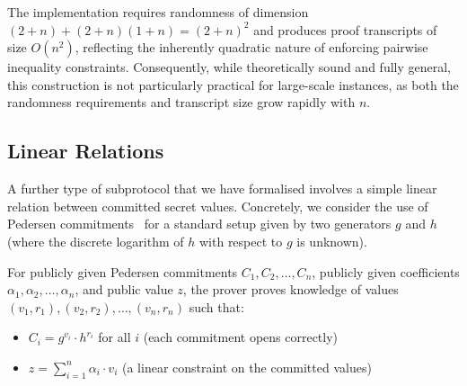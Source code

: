 The implementation \texttt{} requires randomness of dimension \((2+n) + (2+n)(1+n) = (2+n)^2\) and produces proof transcripts of size \(O(n^2)\), reflecting the inherently quadratic nature of enforcing pairwise inequality constraints. Consequently, while theoretically sound and fully general, this construction is not particularly practical for large-scale instances, as both the randomness requirements and transcript size grow rapidly with \(n\).

\subsection{Linear Relations}
A further type of subprotocol that we have formalised involves a simple linear relation between committed secret values.
Concretely, we consider the use of Pedersen commitments~\cite{pedersen1991non} for a standard setup given by two generators $g$
and $h$ (where the discrete logarithm of $h$ with respect to $g$ is unknown).

For publicly given Pedersen commitments $C_1, C_2, \ldots, C_n$, publicly given coefficients $\alpha_1, \alpha_2, \ldots, \alpha_n$,
and public value $z$, the prover proves knowledge of values $(v_1, r_1), (v_2, r_2), \ldots, (v_n, r_n)$ such that:
\begin{itemize}
\item $C_i = g^{v_i} \cdot h^{r_i}$ for all $i$ (each commitment opens correctly)
\item $z = \sum_{i=1}^{n} \alpha_i \cdot v_i$ (a linear constraint on the committed values)
\end{itemize}


